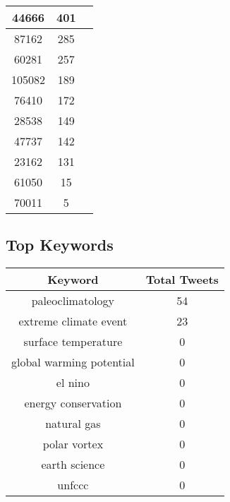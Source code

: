 \documentclass{article}\usepackage[T1]{fontenc}
\begin{document}
\begin{tabular}{|c|c|c|}
 \hline
44666 & 401\\ 
 \hline
87162 & 285\\ 
 \hline
60281 & 257\\ 
 \hline
105082 & 189\\ 
 \hline
76410 & 172\\ 
 \hline
28538 & 149\\ 
 \hline
47737 & 142\\ 
 \hline
23162 & 131\\ 
 \hline
61050 & 15\\ 
 \hline
70011 & 5\\ 
 \hline
\end{tabular}\subsection*{Top Keywords}\begin{tabular}{|c|c|}         \hline         Keyword & Total Tweets \\ 
 \hline
paleoclimatology & 54\\ 
 \hline
extreme climate event & 23\\ 
 \hline
surface temperature & 0\\ 
 \hline
global warming potential & 0\\ 
 \hline
el nino & 0\\ 
 \hline
energy conservation & 0\\ 
 \hline
natural gas & 0\\ 
 \hline
polar vortex & 0\\ 
 \hline
earth science & 0\\ 
 \hline
unfccc & 0\\ 
 \hline
\end{tabular}
\end{document}
